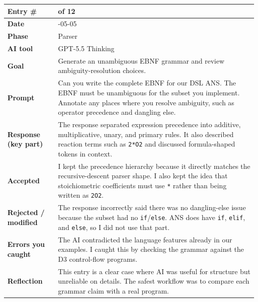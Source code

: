 \documentclass[11pt,a4paper]{article}
\newcommand{\code}[1]{\texttt{#1}}
\newcommand{\entrygap}{\vspace{8pt}}
\newenvironment{journalentry}{%
  \begin{center}\small\renewcommand{\arraystretch}{1.22}%
  \begin{tabular}{|>{\columncolor{anscodebg}\bfseries}p{3.0cm}|>{\RaggedRight\arraybackslash}p{12.25cm}|}%
  \hline
}{%
  \end{tabular}\end{center}\entrygap
}
\begin{document}
\begin{journalentry}
Entry \# & 6 of 12 \\ \hline
Date & 2026-05-05 \\ \hline
Phase & Parser \\ \hline
AI tool & GPT-5.5 Thinking \\ \hline
Goal & Generate an unambiguous EBNF grammar and review ambiguity-resolution choices. \\ \hline
Prompt & Can you write the complete EBNF for our DSL ANS. The EBNF must be unambiguous for the subset you implement. Annotate any places where you resolve ambiguity, such as operator precedence and dangling else. \\ \hline
Response (key part) & The response separated expression precedence into additive, multiplicative, unary, and primary rules. It also described reaction terms such as \code{2*O2} and discussed formula-shaped tokens in context. \\ \hline
Accepted & I kept the precedence hierarchy because it directly matches the recursive-descent parser shape. I also kept the idea that stoichiometric coefficients must use \code{*} rather than being written as \code{2O2}. \\ \hline
Rejected / modified & The response incorrectly said there was no dangling-else issue because the subset had no \code{if}/\code{else}. ANS does have \code{if}, \code{elif}, and \code{else}, so I did not use that part. \\ \hline
Errors you caught & The AI contradicted the language features already in our examples. I caught this by checking the grammar against the D3 control-flow programs. \\ \hline
Reflection & This entry is a clear case where AI was useful for structure but unreliable on details. The safest workflow was to compare each grammar claim with a real program. \\ \hline
\end{journalentry}
\end{document}
